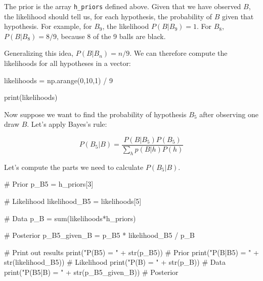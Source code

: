 \documentclass[
  letterpaper,
  DIV=11,
  numbers=noendperiod]{scrreprt}
\newenvironment{Shaded}{\begin{snugshade}}{\end{snugshade}}
\newcommand{\BuiltInTok}[1]{\textcolor[rgb]{0.00,0.23,0.31}{#1}}
\newcommand{\CommentTok}[1]{\textcolor[rgb]{0.37,0.37,0.37}{#1}}
\newcommand{\DecValTok}[1]{\textcolor[rgb]{0.68,0.00,0.00}{#1}}
\newcommand{\NormalTok}[1]{\textcolor[rgb]{0.00,0.23,0.31}{#1}}
\newcommand{\OperatorTok}[1]{\textcolor[rgb]{0.37,0.37,0.37}{#1}}
\newcommand{\StringTok}[1]{\textcolor[rgb]{0.13,0.47,0.30}{#1}}
\begin{document}
The prior is the array \texttt{h\_priors} defined above. Given that we
have observed \(B\), the likelihood should tell us, for each hypothesis,
the probability of \(B\) given that hypothesis. For example, for
\(B_9\), the likelihood \(P(B|B_9) = 1\). For \(B_8\),
\(P(B|B_8) = 8/9\), because 8 of the 9 balls are black.

Generalizing this idea, \(P(B|B_n) = n/9\). We can therefore compute the
likelihoods for all hypotheses in a vector:

\begin{Shaded}
\begin{Highlighting}[]
\NormalTok{likelihoods }\OperatorTok{=}\NormalTok{ np.arange(}\DecValTok{0}\NormalTok{,}\DecValTok{10}\NormalTok{,}\DecValTok{1}\NormalTok{) }\OperatorTok{/} \DecValTok{9}

\BuiltInTok{print}\NormalTok{(likelihoods)}
\end{Highlighting}
\end{Shaded}

Now suppose we want to find the probability of hypothesis \(B_5\) after
observing one draw \(B\). Let's apply Bayes's rule:

\[P(B_5 | B) = \frac{P(B|B_5) P(B_5)}{\sum_h{p(B|h) P(h)}}\]

Let's compute the parts we need to calculate \(P(B_5 | B)\).

\begin{Shaded}
\begin{Highlighting}[]
\CommentTok{\# Prior}
\NormalTok{p\_B5 }\OperatorTok{=}\NormalTok{ h\_priors[}\DecValTok{3}\NormalTok{]}

\CommentTok{\# Likelihood}
\NormalTok{likelihood\_B5 }\OperatorTok{=}\NormalTok{ likelihoods[}\DecValTok{5}\NormalTok{]}

\CommentTok{\# Data}
\NormalTok{p\_B }\OperatorTok{=} \BuiltInTok{sum}\NormalTok{(likelihoods}\OperatorTok{*}\NormalTok{h\_priors)}

\CommentTok{\# Posterior}
\NormalTok{p\_B5\_given\_B }\OperatorTok{=}\NormalTok{ p\_B5 }\OperatorTok{*}\NormalTok{ likelihood\_B5 }\OperatorTok{/}\NormalTok{ p\_B}

\CommentTok{\# Print out results}
\BuiltInTok{print}\NormalTok{(}\StringTok{"P(B5) = "} \OperatorTok{+} \BuiltInTok{str}\NormalTok{(p\_B5)) }\CommentTok{\# Prior}
\BuiltInTok{print}\NormalTok{(}\StringTok{"P(B|B5) = "} \OperatorTok{+} \BuiltInTok{str}\NormalTok{(likelihood\_B5)) }\CommentTok{\# Likelihood}
\BuiltInTok{print}\NormalTok{(}\StringTok{"P(B) = "} \OperatorTok{+} \BuiltInTok{str}\NormalTok{(p\_B)) }\CommentTok{\# Data}
\BuiltInTok{print}\NormalTok{(}\StringTok{"P(B5|B) = "} \OperatorTok{+} \BuiltInTok{str}\NormalTok{(p\_B5\_given\_B)) }\CommentTok{\# Posterior}
\end{Highlighting}
\end{Shaded}
\end{document}

